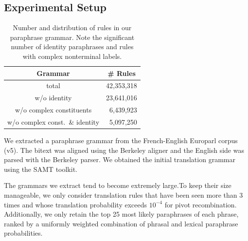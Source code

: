\documentclass[11pt]{article}
\begin{document}

\subsection{Experimental Setup}
\label{setup}

\begin{table}
\begin{center}
\begin{tabular}{|c|r|}
  \hline
  Grammar & \multicolumn{1}{c|}{\# Rules} \\
  \hline
  total & 42,353,318 \\
  w/o identity & 23,641,016 \\
  w/o complex constituents & 6,439,923 \\
  w/o complex const.\ \& identity & 5,097,250 \\
  \hline
\end{tabular}
\end{center}
\caption{Number and distribution of rules in our paraphrase
  grammar. Note the significant number of identity paraphrases and
  rules with complex nonterminal labels.}
\label{grammar_stats}
\end{table}

We extracted a paraphrase grammar from the French-English Europarl
corpus (v5). The bitext was aligned using the Berkeley aligner and the
English side was parsed with the Berkeley parser. We obtained the
initial translation grammar using the SAMT toolkit.

The grammars we extract tend to become extremely large.To keep their
size manageable, we only consider translation rules that have been
seen more than 3 times and whose translation probability exceeds
$10^{-4}$ for pivot recombination. Additionally, we only retain the
top 25 most likely paraphrases of each phrase, ranked by a uniformly
weighted combination of phrasal and lexical paraphrase probabilities.
\end{document}
